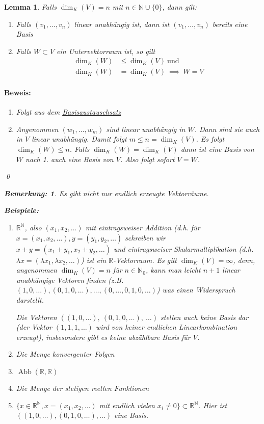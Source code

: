 \documentclass{report}
\newcommand{\lb}{\lambda}
\newcommand{\R}{\mathbb{R}}
\newcommand{\N}{\mathbb{N}}
\newcommand{\mR}{\(\mathbb{R}\)}
\DeclareMathOperator{\abb}{Abb}
\theoremstyle{customrem}
\newtheorem*{bemerkung}{Bemerkung\textnormal:}
\theoremstyle{customdef}
\newtheorem{lemma}[definition]{Lemma}
\renewenvironment{proof}{\paragraph{Beweis: }}{\qed}
\theoremstyle{customenv}
\begin{document}
	\begin{lemma}
		Falls \(\dim_K(V) = n\) mit \(n \in \N \cup \{0\}\), dann gilt:
		\begin{enumerate}
			\item Falls \((v_1, \dots, v_n)\) linear unabhängig ist, dann ist \((v_1, \ldots, v_n)\) bereits eine Basis
			\item Falls \(W \subset V\) ein Untervektorraum ist, so gilt
			\begin{align*}
			\dim_K(W) &\le \dim_K(V)\ \text{und}\\
			\dim_K(W) &= \dim_K(V)\ \implies \ W = V
			\end{align*}
		\end{enumerate}
		
		\begin{proof}
			\begin{enumerate}
				\item Folgt aus dem \hyperref[satz215]{Basisaustauschsatz}
				\item Angenommen \((w_1, \dots, w_m)\) sind linear unabhängig in \(W\). Dann sind sie auch in \(V\) linear unabhängig. Damit folgt \(m \leq n = \dim_K(V)\). Es folgt \(\dim_K(W) \leq n\). Falls \(\dim_K(W) = \dim_K(V)\) dann ist eine Basis von \(W\) nach 1. auch eine Basis von \(V\). Also folgt sofort \(V = W\).
			\end{enumerate}
		\end{proof}
		\begin{bemerkung}
			Es gibt nicht nur endlich erzeugte Vektorräume.\\
		\end{bemerkung}
		\begin{minipage}{\textwidth}
			\textbf{Beispiele: }
			\begin{enumerate}
				\item \(\R^\N\), also \((x_1, x_2, \ldots)\) mit eintragsweiser Addition (d.h. für \(x = (x_1, x_2, \ldots), y = (y_1, y_2, \ldots)\) schreiben wir \(x + y = (x_1 + y_1, x_2 + y_2, \ldots)\) und eintragsweiser Skalarmultiplikation (d.h. \(\lb x = (\lb x_1, \lb x_2, \ldots)\)) ist ein \mR -Vektorraum. Es gilt \(\dim_K(V) = \infty\), denn, angenommen \(\dim_K(V) = n\) für \(n \in \N_0\), kann man leicht \(n + 1\) linear unabhängige Vektoren finden (z.B. \((1, 0, \ldots), (0, 1, 0, \ldots), \dots, (0, \ldots, 0, 1, 0, \ldots)\)) was einen Widerspruch darstellt. \Lightning
				
				Die Vektoren \(((1, 0, \dots),\ (0, 1, 0, \dots),\ \dots)\) stellen auch keine Basis dar (der Vektor \((1, 1, 1, \ldots)\) wird von keiner \textit{endlichen} Linearkombination erzeugt), insbesondere gibt es keine abzählbare Basis für \(V\).
				\item Die Menge konvergenter Folgen
				\item \(\abb(\R, \R)\)
				\item Die Menge der stetigen reellen Funktionen
				\item  \(\{x \in \R^\N, x = (x_1, x_2, \dots)\) mit endlich vielen \(x_i \neq 0\} \subset \R^\N\). Hier ist \(((1, 0, \dots), (0, 1, 0, \dots), \dots)\) eine Basis.
			\end{enumerate}
		\end{minipage}
	\end{lemma}
\end{document}
